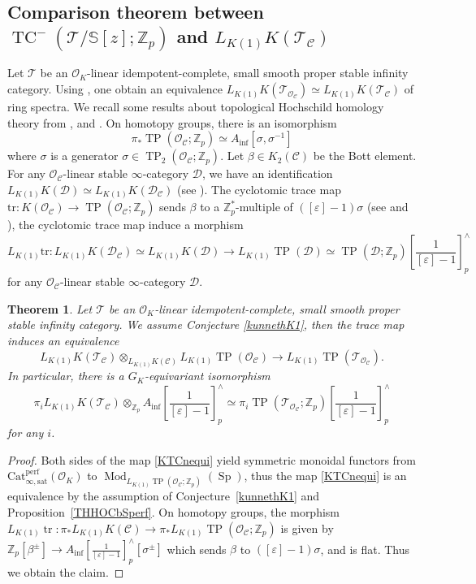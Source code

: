 \documentclass[11pt]{amsart}
\newcommand{\Z}{\mathbb{Z}}
\newcommand{\sD}{\mathcal{D}}
\newcommand{\sO}{\mathcal{O}}
\newcommand{\sT}{\mathcal{T}}
\newcommand{\bS}{\mathbb{S}}
\newcommand{\Mod}{\operatorname{Mod}}
\newcommand{\LK}{{L_{K(1)}}}
\newcommand{\TP}{\operatorname{TP}}
\newcommand{\TCn}{\operatorname{TC}^{-}}
\newcommand{\tr}{{\operatorname{tr}}}
\renewcommand{\epsilon}{\varepsilon}
\newcommand{\Ainf}{A_{\operatorname{inf}}}
\newcommand{\Cu}{\mathcal{C}}
\newcommand{\Catsat}{\operatorname{Cat_{\infty,sat}^{perf}}}
\newcounter{spec}
\newcommand{\Sp}{\operatorname{Sp}}
\newtheorem{thm}[lemma]{Theorem}
\theoremstyle{definition}
\theoremstyle{remark}
\numberwithin{equation}{section}
\begin{document}
\subsection{Comparison theorem between $\TCn(\sT/\bS[z];\Z_p)$ and $\LK K(\sT_{\Cu})$} Let $\sT$ be an $\sO_K$-linear idempotent-complete, small smooth proper stable infinity category. Using \cite[Thm 2.16]{remarkonK1}, one obtain an equivalence $\LK K(\sT_{\sO_{\Cu}}) \simeq \LK K(\sT_\Cu)$ of ring spectra. We recall some results about topological Hochschild homology theory from \cite{Lars}, \cite{remarkonK1} and \cite{BMS2}. On homotopy groups, there is an isomorphism
\begin{equation}
  \pi_*\TP(\sO_\Cu;\Z_p) \simeq \Ainf[\sigma,\sigma^{-1}]
\end{equation}
where $\sigma$ is a generator $\sigma \in \TP_2(\sO_\Cu;\Z_p)$. Let $\beta\in K_2(\Cu)$ be the Bott element. For any $\sO_\Cu$-linear stable $\infty$-category $\sD$, we have an identification $\LK K(\sD) \simeq \LK K(\sD_\Cu)$ (see \cite[Theorem~2.16]{remarkonK1}). The cyclotomic trace map $\text{tr}:K(\sO_\Cu) \to \TP(\sO_\Cu;\Z_p)$ sends $\beta$ to a $\Z_p^*$-multiple of $([\epsilon]-1)\sigma$ (see \cite{Lars} and \cite[Theorem 1.3.6]{HN}), the cyclotomic trace map induce a morphism
\[
\LK\text{tr}:\LK K(\sD_\Cu)\simeq \LK K(\sD) \to \LK \TP(\sD)\simeq \TP(\sD;\Z_p)[\frac{1}{[\epsilon]-1}]^{\wedge}_p
\]
for any $\sO_\Cu$-linear stable $\infty$-category $\sD$.
\begin{thm}\label{KTCncomp}
Let $\sT$ be an $\sO_K$-linear idempotent-complete, small smooth proper stable infinity category. We assume Conjecture \ref{kunnethK1}, then the trace map induces an equivalence
\begin{equation}\label{KTCnequi}
\LK K(\sT_\Cu)\otimes_{\LK K(\Cu)} \LK \TP(\sO_\Cu) \to \LK \TP(\sT_{\sO_\Cu}).
\end{equation}
In particular, there is a $G_K$-equivariant isomorphism
\[
\pi_i \LK K(\sT_\Cu) \otimes_{\Z_p} \Ainf[\frac{1}{[\epsilon]-1}]^{\wedge}_p \simeq \pi_i \TP(\sT_{\sO_\Cu};\Z_p)[\frac{1}{[\epsilon]-1}]^{\wedge}_p
\]
for any $i$.
\end{thm}
\begin{proof}
Both sides of the map \eqref{KTCnequi} yield symmetric monoidal functors from $\Catsat(\sO_K)$ to $\Mod_{\LK\TP(\sO_\Cu;\Z_p)}(\Sp)$, thus the map \eqref{KTCnequi} is an equivalence by the assumption of Conjecture~\ref{kunnethK1} and Proposition~\ref{THHOCbSperf}. On homotopy groups, the morphism $\LK \tr :\pi_*\LK K(\Cu)\to \pi_*\LK\TP(\sO_\Cu;\Z_p)$ is given by $\Z_p[\beta^{\pm}] \to \Ainf[\frac{1}{[\epsilon]-1}]^{\wedge}_p[\sigma^{\pm}]$ which sends $\beta$ to $([\epsilon]-1)\sigma$, and is flat. Thus we obtain the claim.
\end{proof}
\end{document}
